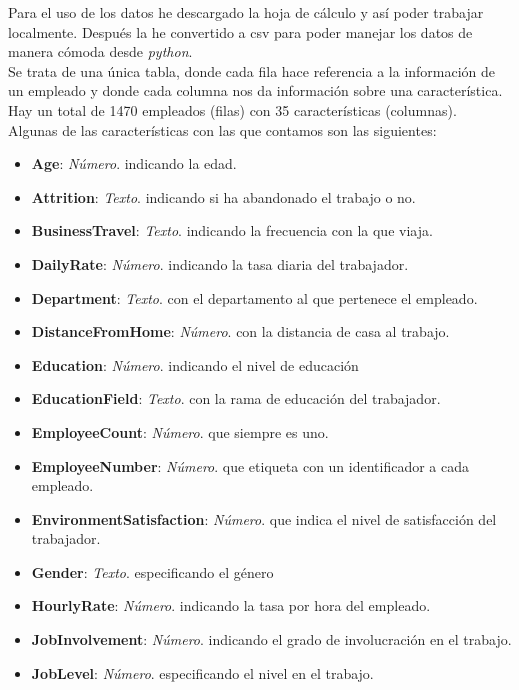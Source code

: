Para el uso de los datos he descargado la hoja de cálculo y así poder trabajar localmente.
Después la he convertido a \acrshort{csv} para poder manejar los datos de manera cómoda desde \textit{python}.\\


Se trata de una única tabla, donde cada fila hace referencia a la información de un empleado y donde cada columna nos da información sobre una característica.\\

Hay un total de 1470 empleados (filas) con 35 características (columnas).\\

Algunas de las características con las que contamos son las siguientes:
\begin{itemize}
\item \textbf{Age}: \textit{Número}. indicando la edad.
\item \textbf{Attrition}: \textit{Texto}. indicando si ha abandonado el trabajo o no.
\item \textbf{BusinessTravel}: \textit{Texto}. indicando la frecuencia con la que viaja.
\item \textbf{DailyRate}: \textit{Número}. indicando la tasa diaria del trabajador.
\item \textbf{Department}: \textit{Texto}. con el departamento al que pertenece el empleado.
\item \textbf{DistanceFromHome}: \textit{Número}. con la distancia de casa al trabajo.
\item \textbf{Education}: \textit{Número}. indicando el nivel de educación
\item \textbf{EducationField}: \textit{Texto}. con la rama de educación del trabajador.
\item \textbf{EmployeeCount}: \textit{Número}. que siempre es uno.
\item \textbf{EmployeeNumber}: \textit{Número}. que etiqueta con un identificador a cada empleado.
\item \textbf{EnvironmentSatisfaction}: \textit{Número}. que indica el nivel de satisfacción del trabajador.
\item \textbf{Gender}: \textit{Texto}. especificando el género
\item \textbf{HourlyRate}: \textit{Número}. indicando la tasa por hora del empleado.
\item \textbf{JobInvolvement}: \textit{Número}. indicando el grado de involucración en el trabajo.
\item \textbf{JobLevel}: \textit{Número}. especificando el nivel en el trabajo.

\end{itemize}
